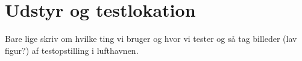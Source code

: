 \section{Udstyr og testlokation}
\label{UdstyrOgTestlokationValgAfGestikker}
%
Bare lige skriv om hvilke ting vi bruger og hvor vi tester og så tag billeder (lav figur?) af testopstilling i lufthavnen. 